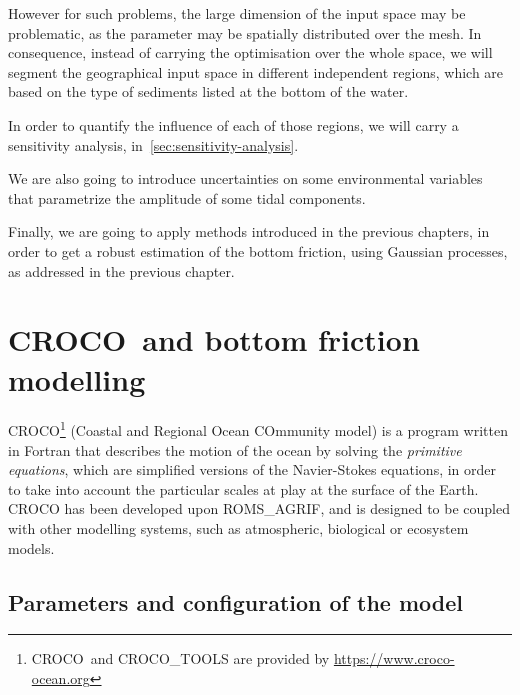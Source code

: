 \documentclass[../../Main_ManuscritThese.tex]{subfiles}
\newcommand{\CROCO}{CROCO}
\begin{document}
However for such problems, the large dimension of the input space may
be problematic, as the parameter may be spatially distributed over the
mesh. In consequence, instead of carrying the optimisation over the
whole space, we will segment the geographical input space in different
independent regions, which are based on the type of sediments listed
at the bottom of the water.

In order to quantify the influence of each of those regions, we will
carry a sensitivity analysis, in~\cref{sec:sensitivity-analysis}.


We are also going to introduce uncertainties on some environmental
variables that parametrize the amplitude of some tidal components. 

Finally, we are going to apply methods introduced in the previous
chapters, in order to get a robust estimation of the bottom friction,
using Gaussian processes, as addressed in the previous chapter.



\section{\CROCO\ and bottom friction modelling}
\label{sec:croco_bottom_fr}
\CROCO{}\footnote{\CROCO\ and CROCO\_TOOLS are provided by
  \url{https://www.croco-ocean.org}} (Coastal and Regional Ocean
COmmunity model) is a program written in Fortran that describes the
motion of the ocean by solving the \emph{primitive equations}, which
are simplified versions of the Navier-Stokes equations, in order to
take into account the particular scales at play at the surface of the
Earth. \CROCO{} has been developed upon ROMS\_AGRIF, and is designed
to be coupled with other modelling systems, such as atmospheric,
biological or ecosystem models.



\subsection{Parameters and configuration of the model}
\label{sec:geographical_setting}
\end{document}
